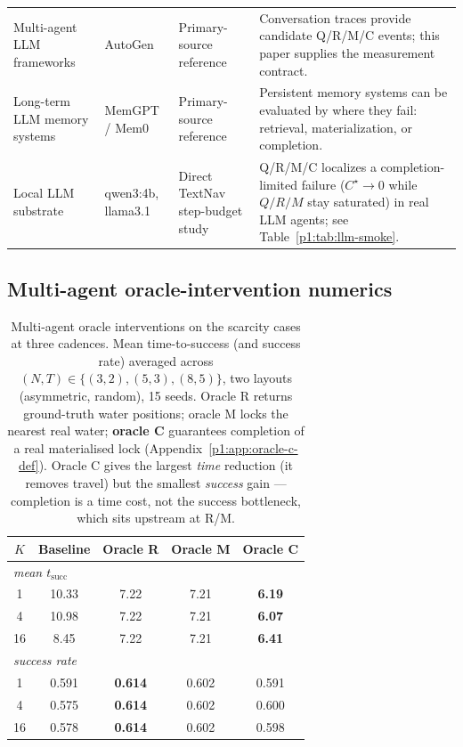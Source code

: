 \documentclass{article}
\begin{document}
\begin{table}[h]
\begin{tabular}{p{2.45cm}p{2.55cm}p{2.7cm}p{4.0cm}}
Multi-agent LLM frameworks & AutoGen \citep{wu2023autogen} & Primary-source reference & Conversation traces provide candidate Q/R/M/C events; this paper supplies the measurement contract. \\
Long-term LLM memory systems & MemGPT / Mem0 \citep{packer2023memgpt,chhikara2025mem0} & Primary-source reference & Persistent memory systems can be evaluated by where they fail: retrieval, materialization, or completion. \\
Local LLM substrate & qwen3:4b, llama3.1 & Direct TextNav step-budget study & Q/R/M/C localizes a completion-limited failure ($C^\star{\to}0$ while $Q/R/M$ stay saturated) in real LLM agents; see Table~\ref{p1:tab:llm-smoke}. \\
\bottomrule
\end{tabular}
\end{table}

\subsection{Multi-agent oracle-intervention numerics}
\label{p1:app:multi-oracle}

\begin{table}[h]
\caption{Multi-agent oracle interventions on the scarcity cases at three cadences. Mean time-to-success (and success rate) averaged across $(N,T)\in\{(3,2),(5,3),(8,5)\}$, two layouts (asymmetric, random), 15 seeds. Oracle R returns ground-truth water positions; oracle M locks the nearest real water; \textbf{oracle C} guarantees completion of a real materialised lock (Appendix~\ref{p1:app:oracle-c-def}). Oracle C gives the largest \emph{time} reduction (it removes travel) but the smallest \emph{success} gain --- completion is a time cost, not the success bottleneck, which sits upstream at R/M.}
\label{p1:tab:multi-agent-oracle}
\centering
\small
\begin{tabular}{c c c c c}
\toprule
$K$ & Baseline & Oracle R & Oracle M & Oracle C \\
\midrule
\multicolumn{5}{l}{\emph{mean $t_{\mathrm{succ}}$}}\\
1  & 10.33 & 7.22 & 7.21 & \textbf{6.19} \\
4  & 10.98 & 7.22 & 7.21 & \textbf{6.07} \\
16 &  8.45 & 7.22 & 7.21 & \textbf{6.41} \\
\midrule
\multicolumn{5}{l}{\emph{success rate}}\\
1  & 0.591 & \textbf{0.614} & 0.602 & 0.591 \\
4  & 0.575 & \textbf{0.614} & 0.602 & 0.600 \\
16 & 0.578 & \textbf{0.614} & 0.602 & 0.598 \\
\bottomrule
\end{tabular}
\end{table}
\end{document}
